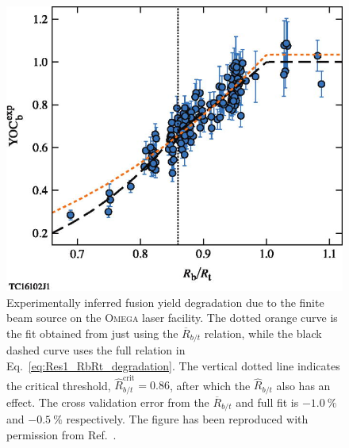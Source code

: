 \begin{figure}[t!]
    \includegraphics[width=0.7\linewidth]{Results1/Images/RbRt_degradation_Lees.jpeg}
    \centering
    \caption{Experimentally inferred fusion yield degradation due to the finite beam source on the \textsc{Omega} laser facility.
    The dotted orange curve is the fit obtained from just using the $\overline{R}_{b/t}$ relation, while the black dashed curve uses the full relation in Eq.~\ref{eq:Res1_RbRt_degradation}.
    The vertical dotted line indicates the critical threshold, $\hat{R}_{b/t}^{\text{crit}}=0.86$, after which the $\hat{R}_{b/t}$ also has an effect.
    The cross validation error from the $\overline{R}_{b/t}$ and full fit is $-1.0\ \%$ and $-0.5\ \%$ respectively.
    The figure has been reproduced with permission from Ref.~\cite{lees_understanding_2023}.}%
    \label{fig:RbRt_YOC_lees}
\end{figure}

